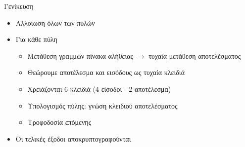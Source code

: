 \documentclass[handout]{beamer}
\begin{document}
\begin{frame}{Γενίκευση}
	 
	\begin{itemize}
		\item Αλλοίωση όλων των πυλών
		\item Για κάθε πύλη
		\begin{itemize}
			\item  Mετάθεση γραμμών πίνακα αλήθειας $\rightarrow$ τυχαία μετάθεση αποτελέσματος
			\item  Θεώρουμε αποτέλεσμα και εισόδους ως τυχαία κλειδιά
			\item  Χρειάζονται 6 κλειδιά (4 είσοδοι - 2 αποτέλεσμα)
			\item  Υπολογισμός πύλης: γνώση κλειδιού αποτελέσματος
			\item  Τροφοδοσία επόμενης
		\end{itemize}		
		\item Οι τελικές έξοδοι αποκρυπτογραφούνται
	\end{itemize}
	 
\end{frame}
\end{document}
